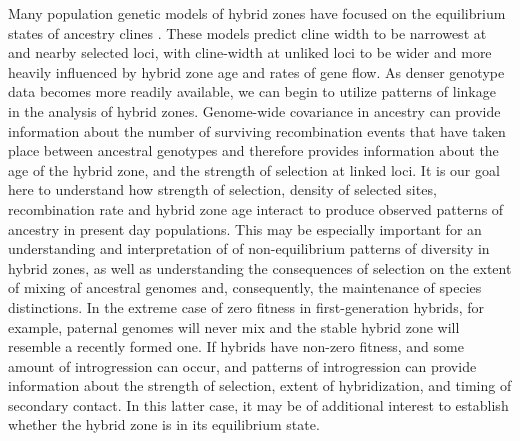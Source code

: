 \documentclass[12pt]{article}
\begin{document}
Many population genetic models of hybrid zones have focused on the equilibrium states of ancestry clines \cite{Barton1979a,Barton1986}. These models predict cline width to be narrowest at and nearby selected loci, with cline-width at unliked loci to be wider and more heavily influenced by hybrid zone age and rates of gene flow. As denser genotype data becomes more readily available, we can begin to utilize patterns of linkage in the analysis of hybrid zones. Genome-wide covariance in ancestry can provide information about the number of surviving recombination events that have taken place between ancestral genotypes and therefore provides information about the age of the hybrid zone, and the strength of selection at linked loci. It is our goal here to understand how strength of selection, density of selected sites, recombination rate and hybrid zone age interact to produce observed patterns of ancestry in present day populations. This may be especially important for an understanding and interpretation of of non-equilibrium patterns of diversity in hybrid zones, as well as understanding the consequences of selection on the extent of mixing of ancestral genomes and, consequently, the maintenance of species distinctions. In the extreme case of zero fitness in first-generation hybrids, for example, paternal genomes will never mix and the stable hybrid zone will resemble a recently formed one. If hybrids have non-zero fitness, and some amount of introgression can occur, and patterns of introgression can provide information about the strength of selection, extent of hybridization, and timing of secondary contact. In this latter case, it may be of additional interest to establish whether the hybrid zone is in its equilibrium state. \\




\end{document}
